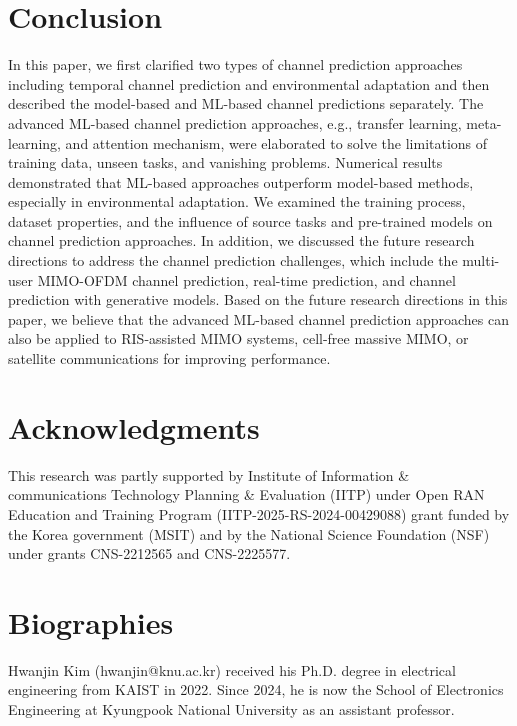 \documentclass[lettersize,journal]{IEEEtran}
\begin{document}
\section{Conclusion}
In this paper, we first clarified two types of channel prediction approaches including temporal channel prediction and environmental adaptation and then described the model-based and ML-based channel predictions separately. The advanced ML-based channel prediction approaches, e.g., transfer learning, meta-learning, and attention mechanism, were elaborated to solve the limitations of training data, unseen tasks, and vanishing problems. Numerical results demonstrated that ML-based approaches outperform model-based methods, especially in environmental adaptation. We examined the training process, dataset properties, and the influence of source tasks and pre-trained models on channel prediction approaches. In addition, we discussed the future research directions to address the channel prediction challenges, which include the multi-user MIMO-OFDM channel prediction, real-time prediction, and channel prediction with generative models. Based on the future research directions in this paper, we believe that the advanced ML-based channel prediction approaches can also be applied to RIS-assisted MIMO systems, cell-free massive MIMO, or satellite communications for improving performance.

\section*{Acknowledgments}
This research was partly supported by Institute of Information \& communications Technology Planning \& Evaluation (IITP) under Open RAN Education and Training Program (IITP-2025-RS-2024-00429088) grant funded by the Korea government (MSIT) and by the National Science Foundation (NSF) under grants CNS-2212565 and CNS-2225577.




\section*{Biographies}

\begin{IEEEbiographynophoto}{Hwanjin Kim}
	(hwanjin@knu.ac.kr) received his Ph.D. degree in electrical engineering from KAIST in 2022. Since 2024, he is now the School of Electronics Engineering at Kyungpook National University as an assistant professor.
\end{IEEEbiographynophoto}
\end{document}
